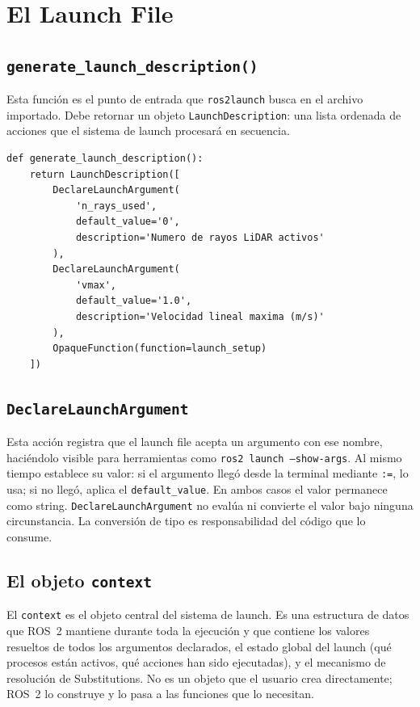 \section{El Launch File}

\subsection{\texttt{generate\_launch\_description()}}

Esta función es el punto de entrada que \texttt{ros2launch} busca en el archivo importado. Debe retornar un objeto \texttt{LaunchDescription}: una lista ordenada de acciones que el sistema de launch procesará en secuencia.

\begin{lstlisting}[style=python, caption={Estructura típica de \texttt{generate\_launch\_description()}.}]
def generate_launch_description():
    return LaunchDescription([
        DeclareLaunchArgument(
            'n_rays_used',
            default_value='0',
            description='Numero de rayos LiDAR activos'
        ),
        DeclareLaunchArgument(
            'vmax',
            default_value='1.0',
            description='Velocidad lineal maxima (m/s)'
        ),
        OpaqueFunction(function=launch_setup)
    ])
\end{lstlisting}

\subsection{\texttt{DeclareLaunchArgument}}

Esta acción registra que el launch file acepta un argumento con ese nombre, haciéndolo visible para herramientas como \texttt{ros2 launch --show-args}. Al mismo tiempo establece su valor: si el argumento llegó desde la terminal mediante \texttt{:=}, lo usa; si no llegó, aplica el \texttt{default\_value}. En ambos casos el valor permanece como string. \texttt{DeclareLaunchArgument} no evalúa ni convierte el valor bajo ninguna circunstancia. La conversión de tipo es responsabilidad del código que lo consume.

\subsection{El objeto \texttt{context}}

El \texttt{context} es el objeto central del sistema de launch. Es una estructura de datos que ROS~2 mantiene durante toda la ejecución y que contiene los valores resueltos de todos los argumentos declarados, el estado global del launch (qué procesos están activos, qué acciones han sido ejecutadas), y el mecanismo de resolución de Substitutions. No es un objeto que el usuario crea directamente; ROS~2 lo construye y lo pasa a las funciones que lo necesitan.

